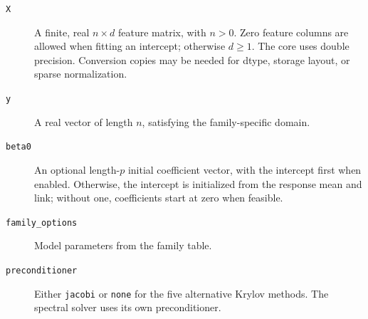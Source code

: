 \documentclass[11pt,a4paper]{article}
\newcommand{\code}[1]{\texttt{#1}}
\begin{document}
\begin{description}
\item[\code{X}] A finite, real $n\times d$ feature matrix, with $n>0$.
Zero feature columns are allowed when fitting an intercept; otherwise $d\geq1$.
The core uses double precision. Conversion copies may be needed for dtype,
storage layout, or sparse normalization.
\item[\code{y}] A real vector of length $n$, satisfying the family-specific domain.
\item[\code{beta0}] An optional length-$p$ initial coefficient vector, with
the intercept first when enabled. Otherwise, the intercept is initialized from
the response mean and link; without one, coefficients start at zero when feasible.
\item[\code{family\_options}] Model parameters from the family table.
\item[\code{preconditioner}] Either \code{jacobi} or \code{none} for the five
alternative Krylov methods. The spectral solver uses its own preconditioner.
\end{description}
\end{document}
